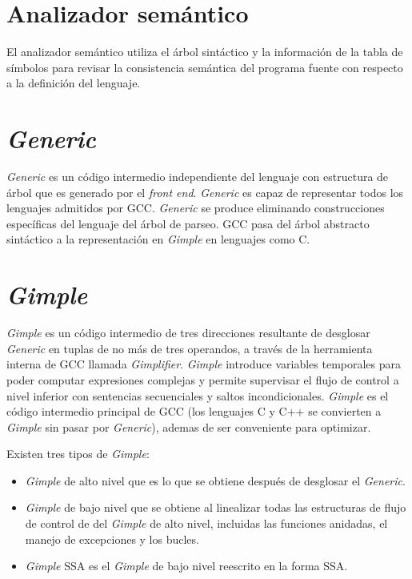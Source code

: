 \section{Analizador semántico}
El analizador semántico utiliza el árbol sintáctico y la información de la tabla de símbolos 
para revisar la consistencia semántica del programa fuente con respecto a la definición del lenguaje. 

\section{\emph{Generic}}

\emph{Generic} es un código intermedio independiente del lenguaje con estructura de árbol 
que es generado por el \emph{front end}. \emph{Generic} es capaz de representar todos los 
lenguajes admitidos por GCC. \emph{Generic} se produce eliminando construcciones específicas 
del lenguaje del árbol de parseo. 
GCC pasa del árbol abstracto sintáctico a la representación en \emph{Gimple} en lenguajes como C.

\section{\emph{Gimple}}

\emph{Gimple} es un código intermedio de tres direcciones resultante de desglosar \emph{Generic} en tuplas 
de no más de tres operandos, a través de la herramienta interna de GCC llamada \emph{Gimplifier}. 
\emph{Gimple} introduce variables temporales para poder computar expresiones complejas y permite 
supervisar el flujo de control a nivel inferior con sentencias secuenciales y saltos incondicionales. 
\emph{Gimple} es el código intermedio principal de GCC (los lenguajes C y C++ se convierten a \emph{Gimple} 
sin pasar por \emph{Generic}), ademas de ser conveniente para optimizar. 

Existen tres tipos de \emph{Gimple}:

\begin{itemize}
    \item \emph{Gimple} de alto nivel que es lo que se obtiene después de desglosar el \emph{Generic}.
    \item \emph{Gimple} de bajo nivel que se obtiene al linealizar todas las estructuras de flujo de control de 
            del \emph{Gimple} de alto nivel, incluidas las funciones anidadas, el manejo de excepciones y los bucles.
    \item \emph{Gimple} SSA es el \emph{Gimple} de bajo nivel reescrito en la forma SSA\cite{GCCintermediate}.
\end{itemize}

